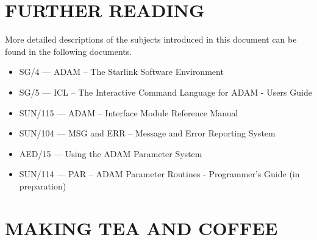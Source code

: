 \section{FURTHER READING}
More detailed descriptions of the subjects introduced in this document
can be found in the following documents.
\begin{itemize}
\item SG/4 --- ADAM -- The Starlink Software Environment
\item SG/5 --- ICL -- The Interactive Command Language for ADAM - Users Guide
\item SUN/115 --- ADAM --  Interface Module Reference Manual
\item SUN/104 --- MSG and ERR -- Message and Error Reporting System
\item AED/15 --- Using the ADAM Parameter System
\item SUN/114 --- PAR -- ADAM Parameter Routines - Programmer's Guide
(in preparation)
\end{itemize}

\appendix
\newpage
\section{MAKING TEA AND COFFEE}


